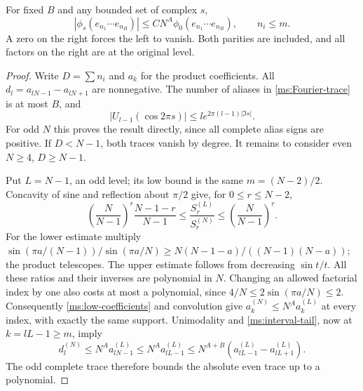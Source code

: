 \begin{proposition}\label{ms:low-trace}
For fixed $B$ and any bounded set of complex $s$,
\begin{equation}\label{ms:low-trace-bound}
 |\phi_s(e_{n_1}\cdots e_{n_B})|
       \le C N^A\phi_0(e_{n_1}\cdots e_{n_B}),\qquad n_i\le m.
\end{equation}
A zero on the right forces the left to vanish. Both parities are
included, and all factors on the right are at the original level.
\end{proposition}
\begin{proof}
Write $D=\sum n_i$ and $a_k$ for the product coefficients.
All $d_l=a_{lN-1}-a_{lN+1}$ are nonnegative. The number of aliases
in \eqref{ms:Fourier-trace} is at most $B$, and
\[
 |U_{l-1}(\cos2\pi s)|\le l e^{2\pi(l-1)|\Im s|}.
\]
For odd $N$ this proves the result directly, since all complete
alias signs are positive. If $D<N-1$, both traces vanish by degree.
It remains to consider even $N\ge4$, $D\ge N-1$.

Put $L=N-1$, an odd level; its low bound is the same $m=(N-2)/2$.
Concavity of sine and reflection about $\pi/2$ give, for
$0\le r\le N-2$,
\begin{equation}\label{ms:adjacent-products}
 \left(\frac N{N-1}\right)^r\frac{N-1-r}{N-1}
 \le\frac{S_r^{(L)}}{S_r^{(N)}}
 \le\left(\frac N{N-1}\right)^r.
\end{equation}
For the lower estimate multiply
$\sin(\pi a/(N-1))/\sin(\pi a/N)
\ge N(N-1-a)/((N-1)(N-a))$; the product telescopes.
The upper estimate follows from decreasing $\sin t/t$.
All these ratios and their inverses are polynomial in $N$.
Changing an allowed factorial index by one also costs at most a
polynomial, since $4/N\le2\sin(\pi a/N)\le2$.
Consequently \eqref{ms:low-coefficients} and convolution give
$a_k^{(N)}\le N^A a_k^{(L)}$ at every index, with exactly the
same support. Unimodality and \eqref{ms:interval-tail}, now at
$k=lL-1\ge m$, imply
\[
 d_l^{(N)}\le N^A a_{lN-1}^{(L)}
 \le N^A a_{lL-1}^{(L)}
 \le N^{A+B}(a_{lL-1}^{(L)}-a_{lL+1}^{(L)}).
\]
The odd complete trace therefore bounds the absolute even trace
up to a polynomial.


\end{proof}
